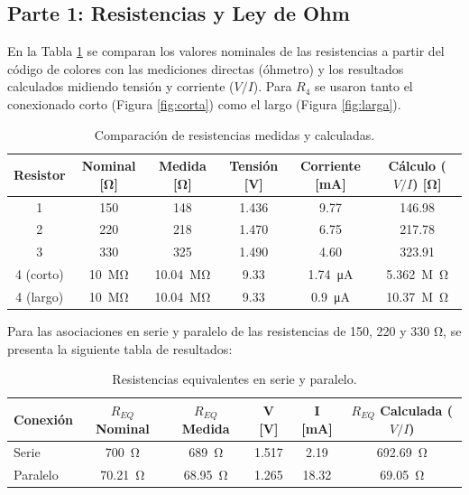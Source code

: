 \documentclass[11pt]{article}
\begin{document}
\subsection{Parte 1: Resistencias y Ley de Ohm}

En la Tabla \ref{tab:ResistenciasParte1} se comparan los valores nominales de las resistencias a partir del código de colores con las mediciones directas (óhmetro) y los resultados calculados midiendo tensión y corriente ($V/I$). Para $R_4$ se usaron tanto el conexionado corto (Figura \ref{fig:corta}) como el largo (Figura \ref{fig:larga}).

\begin{table}[H]
    \centering
    \begin{tabular}{c|ccccc}
    \toprule
    \textbf{Resistor} & \textbf{Nominal [\si{\ohm}]} & \textbf{Medida [\si{\ohm}]} & \textbf{Tensión [\si{V}]} & \textbf{Corriente [\si{mA}]} & \textbf{Cálculo ($V/I$) [\si{\ohm}]} \\
    \midrule
    1 & 150 & 148 & 1.436 & 9.77 & 146.98 \\
    2 & 220 & 218 & 1.470 & 6.75 & 217.78 \\
    3 & 330 & 325 & 1.490 & 4.60 & 323.91 \\
    4 (corto) & \SI{10}{\mega\ohm} & \SI{10.04}{\mega\ohm} & 9.33 & \SI{1.74}{\micro\ampere} & \SI{5.362}{M\ohm} \\
    4 (largo) & \SI{10}{\mega\ohm} & \SI{10.04}{\mega\ohm} & 9.33 & \SI{0.9}{\micro\ampere} & \SI{10.37}{M\ohm} \\
    \bottomrule
    \end{tabular}
    \caption{Comparación de resistencias medidas y calculadas.}
    \label{tab:ResistenciasParte1}
\end{table}

Para las asociaciones en serie y paralelo de las resistencias de 150, 220 y 330 \si{\ohm}, se presenta la siguiente tabla de resultados:

\begin{table}[H]
    \centering
    \begin{tabular}{lccccc}
    \toprule
    \textbf{Conexión} & \textbf{$R_{EQ}$ Nominal} & \textbf{$R_{EQ}$ Medida} & \textbf{V [\si{V}]} & \textbf{I [\si{\milli\ampere}]} & \textbf{$R_{EQ}$ Calculada ($V/I$)} \\
    \midrule
    Serie & \SI{700}{\ohm} & \SI{689}{\ohm} & 1.517 & 2.19 & \SI{692.69}{\ohm} \\
    Paralelo & \SI{70.21}{\ohm} & \SI{68.95}{\ohm} & 1.265 & 18.32 & \SI{69.05}{\ohm} \\
    \bottomrule
    \end{tabular}
    \caption{Resistencias equivalentes en serie y paralelo.}
\end{table}
\end{document}
